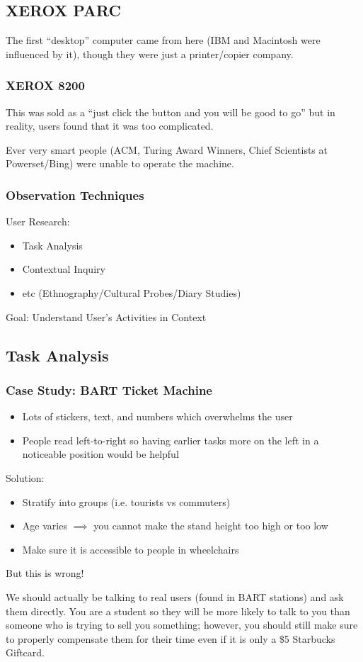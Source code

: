 \subsection{XEROX PARC}
The first ``desktop'' computer came from here (IBM and Macintosh were influenced by it), though they were just a printer/copier company.

\subsubsection{XEROX 8200}
This was sold as a ``just click the button and you will be good to go'' but in reality, users found that it was too complicated.

Ever very smart people (ACM, Turing Award Winners, Chief Scientists at Powerset/Bing) were unable to operate the machine.

\subsubsection{Observation Techniques}
User Research:
\begin{itemize}
    \item Task Analysis
    \item Contextual Inquiry
    \item etc (Ethnography/Cultural Probes/Diary Studies)
\end{itemize}
Goal: Understand User's  Activities in Context

\subsection{Task Analysis}
\subsubsection{Case Study: BART Ticket Machine}
\begin{itemize}
    \item Lots of stickers, text, and numbers which overwhelms the user
    \item People read left-to-right so having earlier tasks more on the left in a noticeable position would be helpful
\end{itemize}

Solution:
\begin{itemize}
    \item Stratify into groups (i.e. tourists vs commuters)
    \item Age varies $\implies$ you cannot make the stand height too high or too low
    \item Make sure it is accessible to people in wheelchairs
\end{itemize}
\begin{important}
But this is wrong!
\end{important}
We should actually be talking to real users (found in BART stations) and ask them directly. You are a student so they will be more likely to talk to you than someone who is trying to sell you something; however, you should still make sure to properly compensate them for their time even if it is only a \$5 Starbucks Giftcard.

